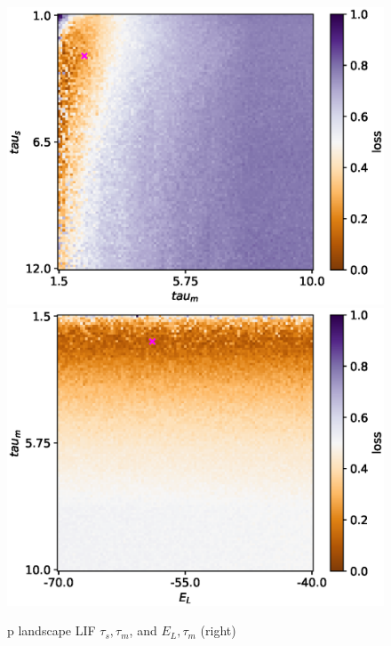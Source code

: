 \documentclass[mphil,deptreport,ianc]{infthesis} %
\begin{document}
\begin{figure}
    \centering
    \vskip -0.1in
    \includegraphics[width=0.49\columnwidth]{figures/param_landscape_heatmaps/LIF/test_export_2d_heatmap_N_4_loss_tau_m_tau_s.eps}
    \includegraphics[width=0.49\columnwidth]{figures/param_landscape_heatmaps/LIF/test_export_2d_heatmap_N_4_loss_E_L_tau_m.eps}
    \vskip -0.1in
    \caption{p landscape LIF $\tau_s, \tau_m$, and $E_L, \tau_m$ (right)}
    \label{fig:p_landscape_hmap_LIF}
\end{figure}




\end{document}
